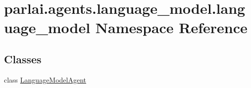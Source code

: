 \hypertarget{namespaceparlai_1_1agents_1_1language__model_1_1language__model}{}\section{parlai.\+agents.\+language\+\_\+model.\+language\+\_\+model Namespace Reference}
\label{namespaceparlai_1_1agents_1_1language__model_1_1language__model}
\subsection*{Classes}
\begin{DoxyCompactItemize}
\item 
class \hyperlink{classparlai_1_1agents_1_1language__model_1_1language__model_1_1LanguageModelAgent}{Language\+Model\+Agent}
\end{DoxyCompactItemize}
